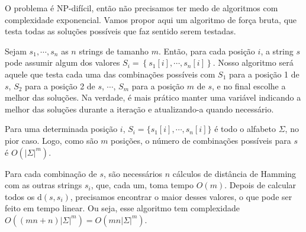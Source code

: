 O problema é NP-difícil, então não precisamos ter medo de algoritmos com complexidade exponencial. Vamos propor aqui um algoritmo de força bruta, que testa todas as soluções possíveis que faz sentido serem testadas.

Sejam $s_1, \cdots, s_n$ as $n$ strings de tamanho $m$. Então, para cada posição $i$, a string $s$ pode assumir algum dos valores $S_i = \left\{s_1[i], \cdots, s_n[i]\right\}$. Nosso algoritmo será aquele que testa cada uma das combinações possíveis com $S_1$ para a posição 1 de $s$, $S_2$ para a posição 2 de $s$, $\cdots$, $S_m$ para a posição $m$ de $s$, e no final escolhe a melhor das soluções. Na verdade, é mais prático manter uma variável indicando a melhor das soluções durante a iteração e atualizando-a quando necessário.

Para uma determinada posição $i$, $S_i = \{s_1[i], \cdots, s_n[i]\}$ é todo o alfabeto $\Sigma$, no pior caso. Logo, como são $m$ posições, o número de combinações possíveis para $s$ é $O(|\Sigma|^m)$.

Para cada combinação de $s$, são necessários $n$ cálculos de distância de Hamming com as outras strings $s_i$, que, cada um, toma tempo $O(m)$.
Depois de calcular todos os $\text{d}(s, s_i)$, precisamos encontrar o maior desses valores, o que pode ser feito em tempo linear.
Ou seja, esse algoritmo tem complexidade $O((mn+n)|\Sigma|^m) = O(mn|\Sigma|^m)$.